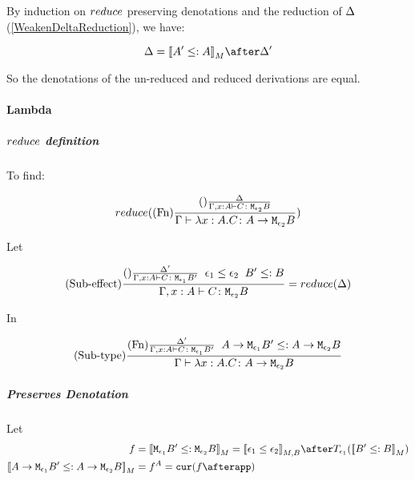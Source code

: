 {            By induction on $reduce$ preserving denotations and the reduction of $\Delta$ (\ref{WeakenDeltaReduction}), we have:

            \begin{equation}
                \D = \deno{A' \subtype A}\after\D'
            \end{equation}

            So the denotations of the un-reduced and reduced derivations are equal.

            \paragraph{Lambda}
            \subparagraph{$reduce$ definition}
                To find:
            
                \begin{equation}
                    reduce((\text{Fn}) \frac{
                        (\text{}) \frac{\Delta}{\Gamma, x: A \vdash C \colon \texttt{M}_{\epsilon_2}{B}}
                    }{\Gamma \vdash \lambda x : A. C \colon A \rightarrow \texttt{M}_{\epsilon_2}{B}})
                \end{equation}

                Let 

                \begin{equation}
                    (\text{Sub-effect}) \frac{
                        (\text{}) \frac{\Delta'}{\Gamma, x: A \vdash C \colon \texttt{M}_{\epsilon_1}{B'}}
                        \;\;
                        \epsilon_1\leq\epsilon_2
                        \;\;
                        B' \leq: B
                    }{
                        \Gamma, x: A \vdash C \colon \texttt{M}_{\epsilon_2}{B}
                    } = reduce(\Delta)
                \end{equation}

                In

                \begin{equation}
                    (\text{Sub-type}) \frac{
                        (\text{Fn}) \frac{
                            \Delta'
                        }{
                            \Gamma, x: A \vdash C \colon \texttt{M}_{\epsilon_1}{B'}
                        }
                        \;\;
                        A \rightarrow \texttt{M}_{\epsilon_1}{B'}\leq:A \rightarrow \texttt{M}_{\epsilon_2}{B}
                    }{
                        \Gamma \vdash \lambda x : A. C \colon A \rightarrow \texttt{M}_{\epsilon_2}{B}
                    }
                \end{equation}

            \subparagraph{Preserves Denotation}
                Let
                \begin{align}
                    f &= \deno{\M{\e_1}{B'}\subtype\M{\e_2}{B}} = \db{\e_1\subeffect\e_2}_{M, B}\after\T{\e_1}{(\deno{B'\subtype B})} \\
                    \deno{\lamtype{A}{\e_1}{B'}\subtype\lamtype{A}{\e_2}{B}} & = f^A = \cur{f\after \app}
                \end{align}

}

